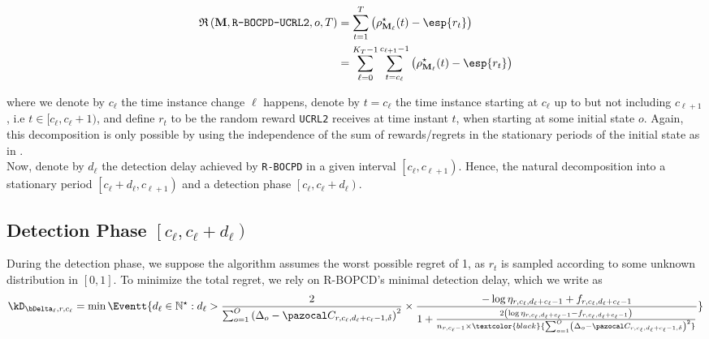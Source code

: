 \documentclass{article} %
\begin{document}
\begin{align*}
\mathfrak{R}\left(\mathbf{M}, \texttt{R-BOCPD-UCRL2}, o, T\right) & =\sum_{t=1}^T\left(\rho_{\mathbf{M_\ell}}^\star(t)- \esp{r_t} \right) \\
& = \sum_{\ell=0}^{K_T-1}  \sum_{t=c_\ell}^{c_{\ell+1}-1} \left(\rho_{\mathbf{M_\ell}}^\star(t)- \esp{r_t}  \right) \\
\end{align*}

where we denote by $c_\ell$ the time instance change $\ell$ happens, denote by $t=c_\ell$ the time instance starting at $c_\ell$ up to but not including $c_{\ell+1}$, i.e $t \in [c_\ell, c_\ell+1)$, and define $r_t$ to be the random reward \texttt{UCRL2} receives at time instant $t$, when starting at some initial state $o$. Again, this decomposition is only possible by using the independence of the sum of rewards/regrets in the stationary periods of the initial state as in \cite{puterman2014markov}.\\

Now, denote by ${d_\ell}$ the detection delay achieved by \texttt{R-BOCPD} in a given interval $\left[c_\ell, c_{\ell+1}\right)$. Hence, the natural decomposition into a stationary period $\left[c_\ell+d_{\ell}, c_{\ell+1}\right)$ and a detection phase $\left[c_\ell, c_\ell+d_{\ell}\right)$.

\subsection{Detection Phase $\left[c_\ell, c_\ell+d_{\ell}\right)$}
During the detection phase, we suppose the algorithm assumes the worst possible regret of 1, as $r_t$ is sampled according to some unknown distribution in $\left[0, 1\right]$. To minimize the total regret, we rely on R-BOPCD's minimal detection delay, which we write as
	\begin{align}\label{eq:delay_cl}
	\kD_{\bDelta_\ell,r,c_\ell} =  \min \Eventt{d_\ell \in \mathbb{N}^\star: d_\ell > \frac{2}{\sum_{o=1}^{O}\left(\Delta_o - \pC_{r,c_\ell, d_\ell+ c_\ell-1 ,\delta}  \right)^2}\times \frac{-\log \eta_{r,c_\ell,d_\ell+c_\ell-1} + f_{r,c_\ell,d_\ell+c_\ell-1}}{1+\frac{2\left(\log \eta_{r,c_\ell,d_\ell+c_\ell-1} - f_{r,c_\ell,d_\ell+c_\ell-1}\right)}{n_{r,c_\ell-1}\times   \textcolor{black}{\sum_{o=1}^{O}\left(\Delta_o - \pC_{r,c_\ell, d_\ell+ c_\ell-1 ,\delta}  \right)^2}}}}
	\end{align}
\end{document}
